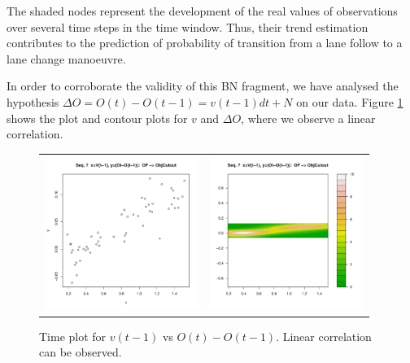 The shaded nodes represent the development of the real values of observations over several time steps in the time window. Thus, their trend estimation contributes to the prediction of probability of transition from a lane follow to a lane change manoeuvre.

In order to corroborate the validity of this BN fragment, we have analysed the hypothesis $\Delta O = O(t) - O(t-1) = v(t-1)dt +N$ on our data. Figure \ref{Figure:daimlerVvsOffs} shows the plot and contour plots for $v$ and $\Delta O$, where we observe a linear correlation. 

\begin{figure}
  \centering
  \setlength{\tabcolsep}{0.05pt}
  \renewcommand{\arraystretch}{0.02}
    \begin{tabular}{cc}
    \includegraphics[width=50mm]{figures/DaimlerOBJplotSerie7.pdf}&
    \includegraphics[width=50mm]{figures/DaimlerOBJcontourSerie7.pdf}\\
  \end{tabular}
      \caption{ \label{Figure:daimlerVvsOffs}Time plot for $v(t-1)$ vs $O(t) - O(t-1)$. Linear correlation can be observed.}
\end{figure}


